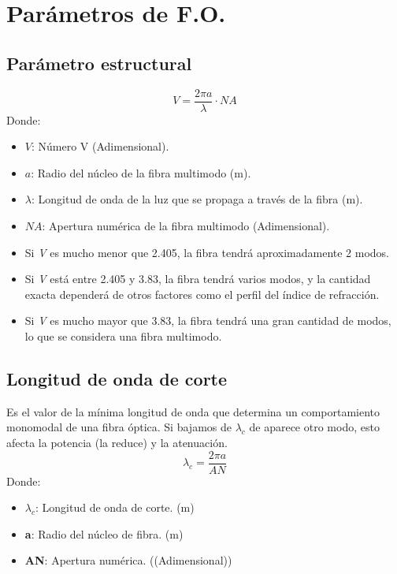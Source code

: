 \documentclass[
	12pt, %
	fleqn, %
	a4paper, %
	oneside, %
]{LegrandOrangeBook}
\begin{document}
\section{Parámetros de F.O.}
\subsection{Parámetro estructural}
\begin{equation}
V = \frac{2\pi a}{\lambda} \cdot NA
\end{equation}
Donde:
\begin{itemize}
\item $V$: Número V (Adimensional).
\item $a$: Radio del núcleo de la fibra multimodo (m).
\item $\lambda$: Longitud de onda de la luz que se propaga a través de la fibra (m).
\item $NA$: Apertura numérica de la fibra multimodo (Adimensional).
\end{itemize}
\begin{itemize}
\item Si \textit{V} es mucho menor que 2.405, la fibra tendrá aproximadamente 2 modos.
\item Si \textit{V} está entre 2.405 y 3.83, la fibra tendrá varios modos, y la cantidad exacta dependerá de otros factores como el perfil del índice de refracción.
\item Si \textit{V} es mucho mayor que 3.83, la fibra tendrá una gran cantidad de modos, lo que se considera una fibra multimodo.
\end{itemize}
\subsection{Longitud de onda de corte}
Es el valor de la mínima longitud de onda que determina un comportamiento monomodal de una fibra óptica. Si bajamos de $\lambda_c$ de aparece otro modo, esto afecta la potencia (la reduce) y la atenuación. 
\begin{equation}
\lambda_c=\frac{2\pi a}{AN}
\end{equation}
Donde:
\begin{itemize}
\item $\lambda_c$: Longitud de onda de corte. (m)
\item \textbf{a}: Radio del núcleo de fibra. (m)
\item \textbf{AN}: Apertura numérica. ((Adimensional))
\end{itemize}
\end{document}
